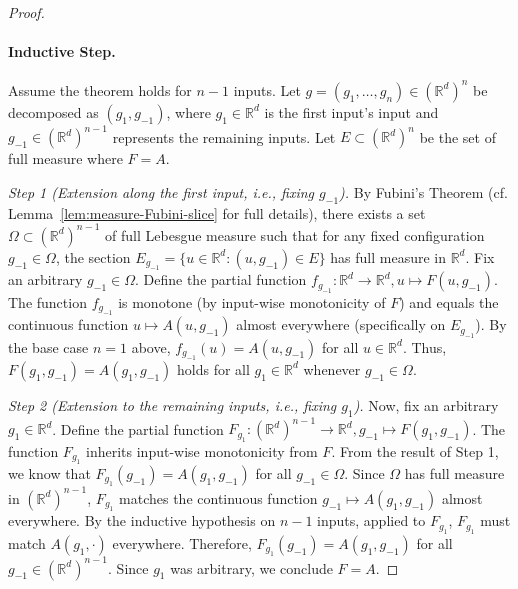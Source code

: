\documentclass[twoside,11pt]{article}
\begin{document}
\begin{proof}
\paragraph{Inductive Step.}
Assume the theorem holds for $n-1$ inputs.
Let $g = (g_1, \ldots, g_n) \in (\mathbb{R}^d)^n$ be decomposed as $(g_1, g_{-1})$, where $g_1 \in \mathbb{R}^d$ is the first input's input and $g_{-1} \in (\mathbb{R}^d)^{n-1}$ represents the remaining inputs.
Let $E \subset (\mathbb{R}^d)^n$ be the set of full measure where $F = A$.

\textit{Step 1 (Extension along the first input, i.e., fixing $g_{-1}$).}
By Fubini's Theorem (cf. Lemma~\ref{lem:measure-Fubini-slice} for full details), there exists a set $\Omega \subset (\mathbb{R}^d)^{n-1}$ of full Lebesgue measure such that for any fixed configuration $g_{-1} \in \Omega$, the section $E_{g_{-1}} = \{ u \in \mathbb{R}^d : (u, g_{-1}) \in E \}$ has full measure in $\mathbb{R}^d$.
Fix an arbitrary $g_{-1} \in \Omega$. 
Define the partial function $f_{g_{-1}}: \mathbb{R}^d \to \mathbb{R}^d, u \mapsto F(u, g_{-1})$.
The function $f_{g_{-1}}$ is monotone (by input-wise monotonicity of $F$) and equals the continuous function $u \mapsto A(u, g_{-1})$ almost everywhere (specifically on $E_{g_{-1}}$).
By the base case $n=1$ above, $f_{g_{-1}}(u) = A(u, g_{-1})$ for all $u \in \mathbb{R}^d$.
Thus, $F(g_1, g_{-1}) = A(g_1, g_{-1})$ holds for all $g_1 \in \mathbb{R}^d$ whenever $g_{-1} \in \Omega$.

\textit{Step 2 (Extension to the remaining inputs, i.e., fixing $g_1$).}
Now, fix an arbitrary $g_1 \in \mathbb{R}^d$. 
Define the partial function $F_{g_1}: (\mathbb{R}^d)^{n-1} \to \mathbb{R}^d, g_{-1} \mapsto F(g_1, g_{-1})$.
The function $F_{g_1}$ inherits input-wise monotonicity from $F$.
From the result of Step 1, we know that $F_{g_1}(g_{-1}) = A(g_1, g_{-1})$ for all $g_{-1} \in \Omega$.
Since $\Omega$ has full measure in $(\mathbb{R}^d)^{n-1}$, $F_{g_1}$ matches the continuous function $g_{-1} \mapsto A(g_1, g_{-1})$ almost everywhere.
By the inductive hypothesis on $n-1$ inputs, applied to $F_{g_1}$, $F_{g_1}$ must match $A(g_1,\cdot)$ everywhere.
Therefore, $F_{g_1}(g_{-1}) = A(g_1, g_{-1})$ for all $g_{-1} \in (\mathbb{R}^d)^{n-1}$.
Since $g_1$ was arbitrary, we conclude $F = A$.
\end{proof}
\end{document}
